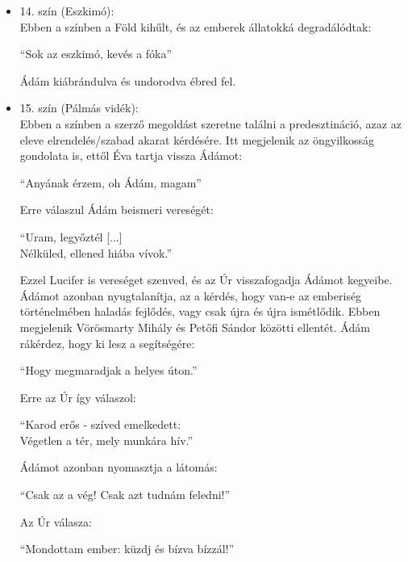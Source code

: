 \documentclass[]{article}
\begin{document}
\begin{itemize}
\begin{displayquote}
{				A cél halál, az élet küzdelem,\\
				S az ember célja e küzdés maga.}
			\end{displayquote}
			Lucifer felteszi a kérdést, hogy mire valók az eszmék, ha úgyis megbuknak, erre Ádám így válaszol:
			\begin{displayquote}
				\enquote{[...] bármi hitvány\\
				Volt eszmém, akkor mégis lelkesített,\\
				Emelt és így nagy és szent eszme volt\\
				$[...]$\\
				Előre vitte az embernemet}
			\end{displayquote}
		\item 14. szín (Eszkimó):\\
			Ebben a színben a Föld kihűlt, és az emberek állatokká degradálódtak:
			\begin{displayquote}
				\enquote{Sok az eszkimó, kevés a fóka}
			\end{displayquote}
			Ádám kiábrándulva és undorodva ébred fel.
		\item 15. szín (Pálmás vidék):\\
			Ebben a színben a szerző megoldást szeretne találni a predesztináció, azaz az eleve elrendelés/szabad akarat kérdésére. Itt megjelenik az öngyilkosság gondolata is, ettől Éva tartja vissza Ádámot:
			\begin{displayquote}
				\enquote{Anyának érzem, oh Ádám, magam}
			\end{displayquote}
			Erre válaszul Ádám beismeri vereségét:
			\begin{displayquote}
				\enquote{Uram, legyőztél [...]\\
				Nélküled, ellened hiába vívok.}
			\end{displayquote}
			Ezzel Lucifer is vereséget szenved, és az Úr visszafogadja Ádámot kegyeibe. Ádámot azonban nyugtalanítja, az a kérdés, hogy van-e az emberiség történelmében haladás fejlődés, vagy csak újra és újra ismétlődik. Ebben megjelenik Vörösmarty Mihály és Petőfi Sándor közötti ellentét. Ádám rákérdez, hogy ki lesz a segítségére:
			\begin{displayquote}
				\enquote{Hogy megmaradjak a helyes úton.}\\
			\end{displayquote}
			Erre az Úr így válaszol:
			\begin{displayquote}
				\enquote{Karod erős - szíved emelkedett:\\
				Végetlen a tér, mely munkára hív.}
			\end{displayquote}
			Ádámot azonban nyomasztja a látomás:
			\begin{displayquote}
				\enquote{Csak az a vég! Csak azt tudnám feledni!}
			\end{displayquote}
			Az Úr válasza:
			\begin{displayquote}
				\enquote{Mondottam ember: küzdj és bízva bízzál!}
			\end{displayquote}
	\end{itemize} 
\end{document}
